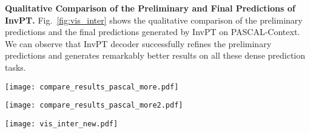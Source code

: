 \documentclass[runningheads]{llncs}
\begin{document}
\par\noindent\textbf{Qualitative Comparison of the Preliminary and Final Predictions of InvPT.}
Fig.~\ref{fig:vis_inter} shows the qualitative comparison of the preliminary predictions and the final predictions generated by InvPT on PASCAL-Context. We can observe that InvPT decoder successfully refines the preliminary predictions and generates remarkably better results on all these dense prediction tasks.


\begin{figure*}[ht]
	\centering
	\texttt{[image: compare\_results\_pascal\_more.pdf]}
	\caption{Qualitative comparison with the best performing method ATRC~\cite{atrc} on PASCAL-Context. Our method generates significantly better results especially on semantic segmentation and human parsing.
	}
	\label{fig:qualitative_pascal}
\end{figure*}


\begin{figure*}[ht]
	\centering
	\texttt{[image: compare\_results\_pascal\_more2.pdf]}
	\caption{Qualitative comparison with the best performing method ATRC~\cite{atrc} on PASCAL-Context. Our method generates significantly better predictions especially on semantic segmentation and human parsing.
	}
	\label{fig:qualitative_pascal2}
\end{figure*}

\begin{figure*}[ht]
	\centering
	\texttt{[image: vis\_inter\_new.pdf]}
	\vspace{-15pt}
	\caption{Qualitative comparison of the  predictions from the preliminary decoder and the final predictions of InvPT decoder on PASCAL-Context. The final predictions on all these tasks are significantly more accurate.
	}
	\vspace{-15pt}
	\label{fig:vis_inter}
\end{figure*}
\end{document}
